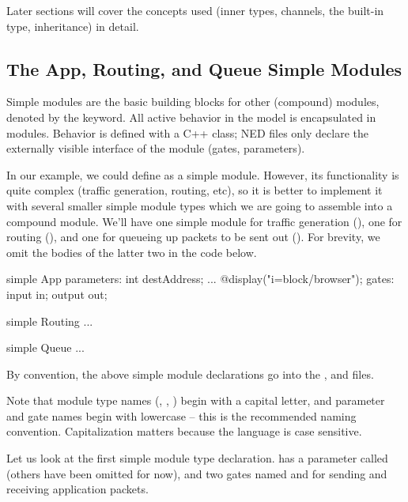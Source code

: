 Later sections will cover the concepts used (inner types, channels, the
 built-in type, inheritance) in detail.


\subsection{The App, Routing, and Queue Simple Modules}

Simple modules are the basic building blocks for other (compound) modules,
denoted by the  keyword.
All active behavior in the model is encapsulated in  modules.
Behavior is defined with a C++ class; NED files only declare the externally
visible interface of the module (gates, parameters).

In our example, we could define  as a simple module. However,
its functionality is quite complex (traffic generation, routing, etc),
so it is better to implement it with several smaller simple module types
which we are going to assemble into a compound module. We'll have
one simple module for traffic generation (), one for routing
(), and one for queueing up packets to be sent out ().
For brevity, we omit the bodies of the latter two in the code below.

\begin{ned}
simple App
{
    parameters:
        int destAddress;
        ...
        @display("i=block/browser");
    gates:
        input in;
        output out;
}

simple Routing
{
    ...
}

simple Queue
{
    ...
}
\end{ned}

By convention, the above simple module declarations go into the
,  and  files.

\begin{note}
    Note that module type names (, , )
    begin with a capital letter, and parameter and gate names begin with
    lowercase -- this is the recommended naming convention. Capitalization
    matters because the language is case sensitive.
\end{note}

Let us look at the first simple module type declaration.  has a
parameter called  (others have been omitted for now),
and two gates named  and  for sending and receiving
application packets.

